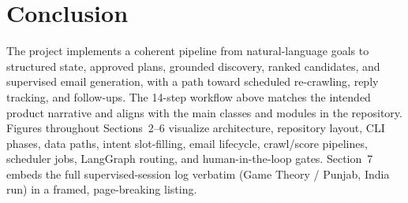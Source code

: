\documentclass[11pt,a4paper]{article}
\begin{document}
\section{Conclusion}

The project implements a coherent pipeline from natural-language goals to structured state, approved plans, grounded discovery, ranked candidates, and supervised email generation, with a path toward scheduled re-crawling, reply tracking, and follow-ups. The 14-step workflow above matches the intended product narrative and aligns with the main classes and modules in the repository. Figures throughout Sections~2--6 visualize architecture, repository layout, CLI phases, data paths, intent slot-filling, email lifecycle, crawl/score pipelines, scheduler jobs, LangGraph routing, and human-in-the-loop gates. Section~7 embeds the full supervised-session log verbatim (Game Theory / Punjab, India run) in a framed, page-breaking listing.
\end{document}
